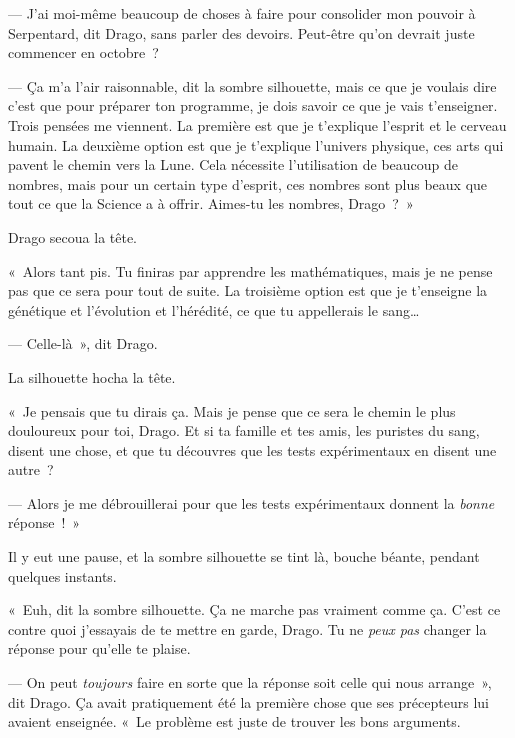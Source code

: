 --- J'ai moi-même beaucoup de choses à faire pour consolider mon pouvoir à Serpentard, dit Drago, sans parler des devoirs.
Peut-être qu'on devrait juste commencer en octobre~?

--- Ça m'a l'air raisonnable, dit la sombre silhouette, mais ce que je voulais dire c'est que pour préparer ton programme, je dois savoir ce que je vais t'enseigner.
Trois pensées me viennent.
La première est que je t'explique l'esprit et le cerveau humain.
La deuxième option est que je t'explique l'univers physique, ces arts qui pavent le chemin vers la Lune.
Cela nécessite l'utilisation de beaucoup de nombres, mais pour un certain type d'esprit, ces nombres sont plus beaux que tout ce que la Science a à offrir.
Aimes-tu les nombres, Drago~?~»

Drago secoua la tête.

«~Alors tant pis.
Tu finiras par apprendre les mathématiques, mais je ne pense pas que ce sera pour tout de suite.
La troisième option est que je t'enseigne la génétique et l'évolution et l'hérédité, ce que tu appellerais le sang…

--- Celle-là~», dit Drago.

La silhouette hocha la tête.

«~Je pensais que tu dirais ça.
Mais je pense que ce sera le chemin le plus douloureux pour toi, Drago.
Et si ta famille et tes amis, les puristes du sang, disent une chose, et que tu découvres que les tests expérimentaux en disent une autre~?

--- Alors je me débrouillerai pour que les tests expérimentaux donnent la \emph{bonne} réponse~!~»

Il y eut une pause, et la sombre silhouette se tint là, bouche béante, pendant quelques instants.

«~Euh, dit la sombre silhouette.
Ça ne marche pas vraiment comme ça.
C'est ce contre quoi j'essayais de te mettre en garde, Drago.
Tu ne \emph{peux pas} changer la réponse pour qu'elle te plaise.

--- On peut \emph{toujours} faire en sorte que la réponse soit celle qui nous arrange~», dit Drago.
Ça avait pratiquement été la première chose que ses précepteurs lui avaient enseignée.
«~Le problème est juste de trouver les bons arguments.

